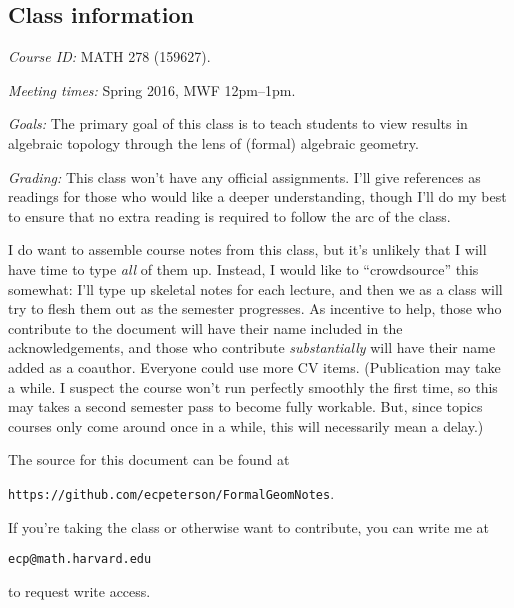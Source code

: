 
\subsection*{Class information}

\vspace{2\baselineskip} \noindent \textit{Course ID: }
MATH 278 (159627).

\vspace{\baselineskip} \noindent \textit{Meeting times: }
Spring 2016, MWF 12pm--1pm.

\vspace{\baselineskip} \noindent \textit{Goals: }
The primary goal of this class is to teach students to view results in algebraic topology through the lens of (formal) algebraic geometry.

\vspace{\baselineskip} \noindent \textit{Grading: }
This class won't have any official assignments. I'll give references as readings for those who would like a deeper understanding, though I'll do my best to ensure that no extra reading is required to follow the arc of the class.

I do want to assemble course notes from this class, but it's unlikely that I will have time to type \emph{all} of them up. Instead, I would like to ``crowdsource'' this somewhat: I'll type up skeletal notes for each lecture, and then we as a class will try to flesh them out as the semester progresses. As incentive to help, those who contribute to the document will have their name included in the acknowledgements, and those who contribute \emph{substantially} will have their name added as a coauthor. Everyone could use more CV items. (Publication may take a while. I suspect the course won't run perfectly smoothly the first time, so this may takes a second semester pass to become fully workable. But, since topics courses only come around once in a while, this will necessarily mean a delay.)

The source for this document can be found at
\begin{center}
\texttt{https://github.com/ecpeterson/FormalGeomNotes}.
\end{center}
If you're taking the class or otherwise want to contribute, you can write me at
\begin{center}
\texttt{ecp@math.harvard.edu}
\end{center}
to request write access.

